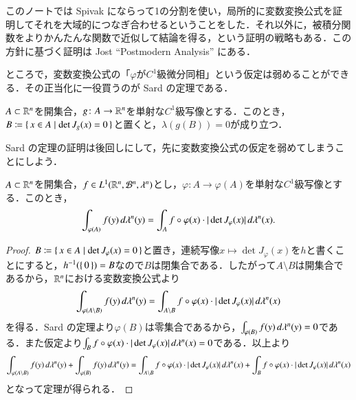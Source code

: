 \begin{que}[**]
このノートでは Spivak にならって1の分割を使い，局所的に変数変換公式を証明してそれを大域的につなぎ合わせるということをした．それ以外に，被積分関数をよりかんたんな関数で近似して結論を得る，という証明の戦略もある．この方針に基づく証明は Jost ``Postmodern Analysis'' にある．
\end{que}

ところで，変数変換公式の「$\varphi$が$C^1$級微分同相」という仮定は弱めることができる．その正当化に一役買うのが Sard の定理である．

\begin{thm}[Sard]
$A \subset \mathbb{R}^n$を開集合，$g \colon A \to \mathbb{R}^n$を単射な$C^1$級写像とする．このとき，$B \coloneqq \set{x \in A | \det J_g(x) = 0}$と置くと，$\lambda(g(B))=0$が成り立つ．
\end{thm}

Sard の定理の証明は後回しにして，先に変数変換公式の仮定を弱めてしまうことにしよう．

\begin{thm}$A \subset \mathbb{R}^n$を開集合，$f \in L^1(\mathbb{R}^n, \mathcal{B}^n ,\lambda^n)$とし，$\varphi \colon A \to \varphi(A)$を単射な$C^1$級写像とする．このとき，
\begin{equation}
\int_{\varphi(A)} f(y) \mathop{}\!d\lambda^n(y) = \int_A f \circ \varphi(x) \cdot | \det J_\varphi(x) | \mathop{}\!d \lambda^n(x).
\end{equation}
\end{thm}

\begin{proof}
$B \coloneqq \set{x \in A | \det J_\varphi(x) = 0}$と置き，連続写像$x \mapsto \det J_\varphi(x)$を$h$と書くことにすると，$h^{-1}(\set{0}) = B$なので$B$は閉集合である．したがって$A \setminus B$は開集合であるから，$\mathbb{R}^n$における変数変換公式より
\begin{equation}
\int_{\varphi(A \setminus B)} f(y) \mathop{}\!d\lambda^n(y) = \int_{A \setminus B} f \circ \varphi(x) \cdot | \det J_\varphi(x) | \mathop{}\!d \lambda^n(x)
\end{equation}を得る．Sard の定理より$\varphi(B)$は零集合であるから，$\int_{\varphi(B)} f(y) \mathop{}\!d\lambda^n(y) = 0$である．また仮定より$\int_{B} f \circ \varphi(x) \cdot | \det J_\varphi(x) | \mathop{}\!d \lambda^n(x) = 0$である．以上より
\begin{equation}
\int_{\varphi(A \setminus B)} f(y) \mathop{}\!d\lambda^n(y) + \int_{\varphi(B)} f(y) \mathop{}\!d\lambda^n(y) = \int_{A \setminus B} f \circ \varphi(x) \cdot | \det J_\varphi(x) | \mathop{}\!d \lambda^n(x) + \int_{B} f \circ \varphi(x) \cdot | \det J_\varphi(x) | \mathop{}\!d \lambda^n(x)
\end{equation}となって定理が得られる．
\end{proof}

